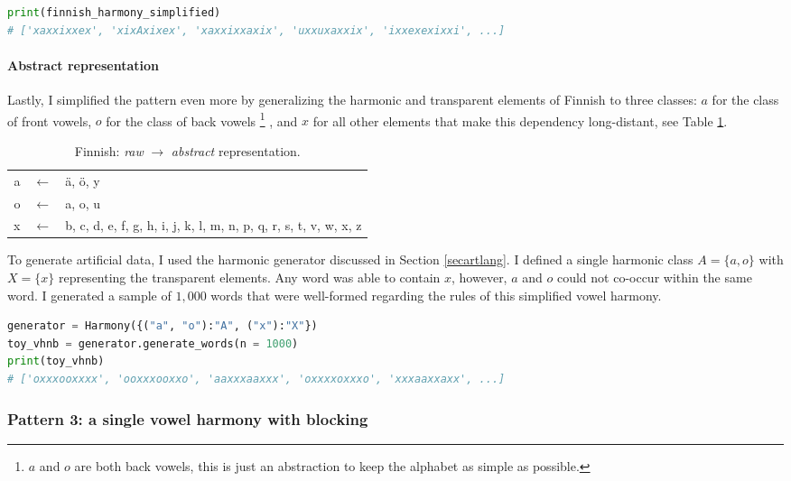 \begin{lstlisting}[language=Python]
print(finnish_harmony_simplified)
# ['xaxxixxex', 'xixAxixex', 'xaxxixxaxix', 'uxxuxaxxix', 'ixxexexixxi', ...]
\end{lstlisting}

\paragraph{Abstract representation}

Lastly, I simplified the pattern even more by generalizing the harmonic and transparent elements of Finnish to three classes: $a$ for the class of front vowels, $o$ for the class of back vowels
\footnote{$a$ and $o$ are both back vowels, this is just an abstraction to keep the alphabet as simple as possible.}
, and $x$ for all other elements that make this dependency long-distant, see Table \ref{finnishmap2}.

\begin{table}[h!]
\begin{center}
\begin{tabular}{rcl}
a & $\leftarrow$ & \"a, \"o, y \\
o & $\leftarrow$ & a, o, u \\
x & $\leftarrow$ & b, c, d, e, f, g, h, i, j, k, l, m, n, p, q, r, s, t, v, w, x, z
\end{tabular}
\end{center}
\caption{Finnish: \emph{raw} $\rightarrow$ \emph{abstract} representation.}
\label{finnishmap2}
\end{table}

To generate artificial data, I used the harmonic generator discussed in Section \ref{secartlang}.
I defined a single harmonic class $A = \{a, o\}$ with $X = \{x\}$ representing the transparent elements.
Any word was able to contain $x$, however, $a$ and $o$ could not co-occur within the same word.
I generated a sample of $1,000$ words that were well-formed regarding the rules of this simplified vowel harmony.

\begin{lstlisting}[language=Python]
generator = Harmony({("a", "o"):"A", ("x"):"X"})
toy_vhnb = generator.generate_words(n = 1000)
print(toy_vhnb)
# ['oxxxooxxxx', 'ooxxxooxxo', 'aaxxxaaxxx', 'oxxxxoxxxo', 'xxxaaxxaxx', ...]
\end{lstlisting}


\subsubsection{Pattern 3: a single vowel harmony with blocking}

